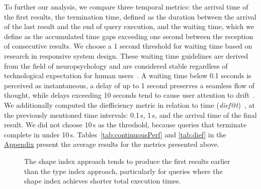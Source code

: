  

To further our analysis, we compare three temporal metrics: the arrival time of the first results, the termination time, defined as the duration between the arrival of the last result and the end of query execution, and the waiting time, which we define as the accumulated time gaps exceeding one second between the reception of consecutive results.
We choose a 1 second threshold for waiting time based on research in responsive system design.
These waiting time guidelines are derived from the field of neuropsychology and are considered stable regardless of technological expectation for human users~\cite{uxtigersNeedSpeed, Nielsen1993}.
A waiting time below 0.1 seconds is perceived as instantaneous, a delay of up to 1 second preserves a seamless flow of thought, while delays exceeding 10 seconds tend to cause user attention to drift~\cite{Nielsen1993}.
We additionally computed the diefficiency metric in relation to time (\textit{dief@t})~\cite{Acosta2017}, at the previously mentioned time intervals: 0.1\,s, 1\,s, and the arrival time of the final result.
We did not choose 10\,s as the threshold, because queries that terminate complete in under 10\,s.
Tables~\ref{tab:continuousPerf} and \ref{tab:dief} in the \hyperref[sec:appendix]{Appendix} present the average results for the metrics presented above.

\begin{figure}
    \centering
    
    \caption{The shape index approach tends to produce the first results earlier than the type index approach, particularly for queries where the shape index achieves shorter total execution times.}
    \label{fig:first_res}
\end{figure}


